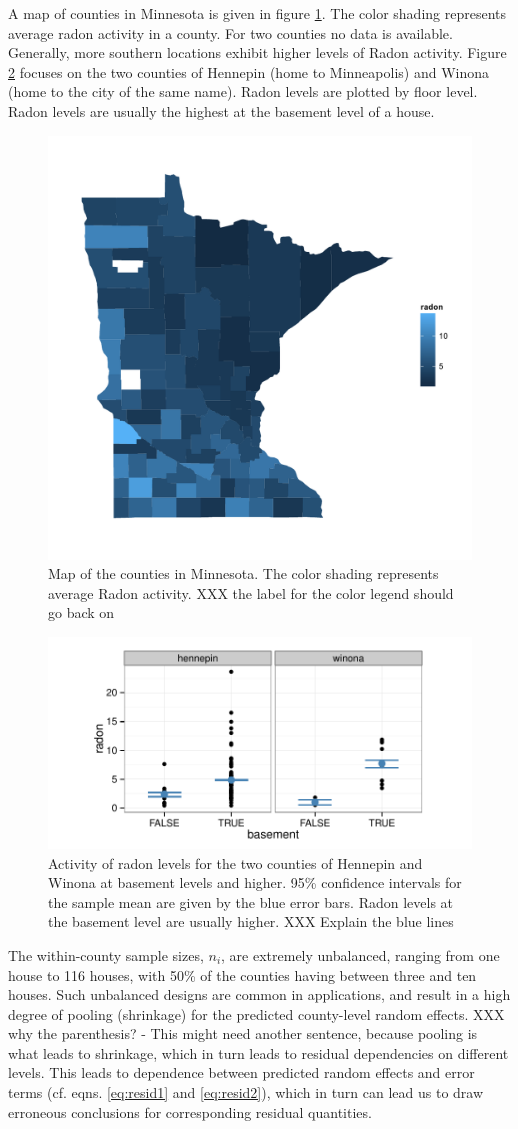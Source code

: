 \documentclass{article} %
\newcommand{\hh}[1]{{\color{orange} #1}}
\newcommand{\al}[1]{{\color{red} #1}}
\begin{document}
A map of counties in Minnesota is given in figure \ref{fig:map}. The color shading represents average radon activity in a county. For two counties no data is available. Generally, more southern locations exhibit higher  levels of Radon activity. Figure \ref{fig:tc} focuses on the two counties of Hennepin (home to Minneapolis) and Winona (home to the city of the same name). Radon levels are plotted by floor level. Radon levels are usually the highest at the basement level of a house. 
%
\begin{figure}[htb]
\centering
\includegraphics[width=0.5\linewidth]{figures/map.pdf}
\caption{\label{fig:map} Map of the counties in Minnesota. The color shading represents average Radon activity. \hh{XXX the label for the color legend should go back on}}
\end{figure}
%
\begin{figure}[htb]
\centering
\includegraphics[width=0.7\linewidth]{figures/radon-twocounties.pdf}
\caption{\label{fig:tc} Activity of radon levels for the two counties of Hennepin and Winona at basement levels and higher. 95\% confidence intervals for the sample mean are given by the blue error bars. Radon levels at the basement level are usually higher. \hh{XXX Explain the blue lines}}
\end{figure}
%
The within-county sample sizes, $n_i$, are extremely unbalanced, ranging from one house to 116 houses, with 50\% of the counties having between three and ten houses. Such unbalanced designs are common in applications, and result in a high degree of pooling \al{(shrinkage)} for the predicted county-level random effects. \hh{XXX why the parenthesis? - This might need another sentence, because pooling is what leads to shrinkage, which in turn leads to residual dependencies on different levels.} %
This leads to dependence between  predicted random effects and  error terms (cf. eqns. \ref{eq:resid1} and \ref{eq:resid2}), which in turn can lead us to draw erroneous conclusions for corresponding residual quantities.
\end{document}
